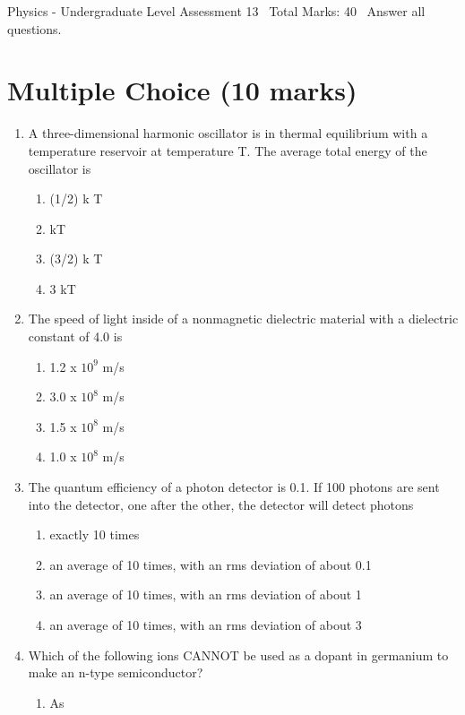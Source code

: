\documentclass[12pt]{article}
\begin{document}
\begin{center}
Physics - Undergraduate Level Assessment 13 \
Total Marks: 40 \
Answer all questions.
\end{center}

\section*{Multiple Choice (10 marks)}
\begin{enumerate}[label=\arabic*.]
\item A three-dimensional harmonic oscillator is in thermal equilibrium with a temperature reservoir at temperature T. The average total energy of the oscillator is
\begin{enumerate}[label=(\alph*)]
    \item (1/2) k T
    \item kT
    \item (3/2) k T
    \item 3 kT
\end{enumerate}
\item The speed of light inside of a nonmagnetic dielectric material with a dielectric constant of 4.0 is
\begin{enumerate}[label=(\alph*)]
    \item 1.2 x $10^9$ m/s
    \item 3.0 x $10^8$ m/s
    \item 1.5 x $10^8$ m/s
    \item 1.0 x $10^8$ m/s
\end{enumerate}
\item The quantum efficiency of a photon detector is 0.1. If 100 photons are sent into the detector, one after the other, the detector will detect photons
\begin{enumerate}[label=(\alph*)]
    \item exactly 10 times
    \item an average of 10 times, with an rms deviation of about 0.1
    \item an average of 10 times, with an rms deviation of about 1
    \item an average of 10 times, with an rms deviation of about 3
\end{enumerate}
\item Which of the following ions CANNOT be used as a dopant in germanium to make an n-type semiconductor?
\begin{enumerate}[label=(\alph*)]
    \item As

\end{enumerate}
\end{enumerate}
\end{document}
